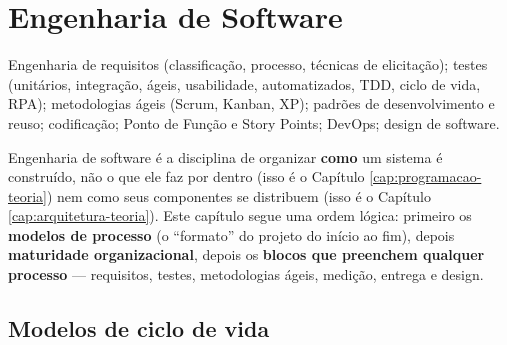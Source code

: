 \chapter{Engenharia de Software}
\label{cap:eng-software-teoria}

\begin{edital}
Engenharia de requisitos (classificação, processo, técnicas de elicitação);
testes (unitários, integração, ágeis, usabilidade, automatizados, TDD, ciclo
de vida, RPA); metodologias ágeis (Scrum, Kanban, XP); padrões de
desenvolvimento e reuso; codificação; Ponto de Função e Story Points; DevOps;
design de software.
\end{edital}

Engenharia de software é a disciplina de organizar \textbf{como} um sistema é
construído, não o que ele faz por dentro (isso é o Capítulo
\ref{cap:programacao-teoria}) nem como seus componentes se distribuem (isso é
o Capítulo \ref{cap:arquitetura-teoria}). Este capítulo segue uma ordem
lógica: primeiro os \textbf{modelos de processo} (o “formato” do projeto do
início ao fim), depois \textbf{maturidade organizacional}, depois os
\textbf{blocos que preenchem qualquer processo} --- requisitos, testes,
metodologias ágeis, medição, entrega e design.

\section{Modelos de ciclo de vida}

